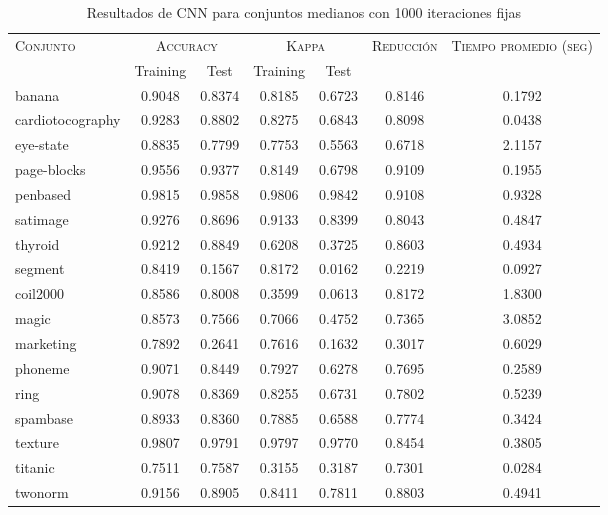 \begin{table}[]
\centering
\begin{tabular}{l c c c c c c}
\hline
\multirow{2}{*}{\textsc{Conjunto}}
	& \multicolumn{2}{c}{\textsc{Accuracy}}
	& \multicolumn{2}{c}{\textsc{Kappa}}
	& \textsc{Reducción}
	& \textsc{Tiempo promedio (seg)} \\
	& Training & Test
	& Training & Test \\ 
\hline
\hline

banana & 0.9048 & 0.8374 & 0.8185 & 0.6723 & 0.8146 & 0.1792 \\
cardiotocography & 0.9283 & 0.8802 & 0.8275 & 0.6843 & 0.8098 & 0.0438 \\
eye-state & 0.8835 & 0.7799 & 0.7753 & 0.5563 & 0.6718 & 2.1157 \\
page-blocks & 0.9556 & 0.9377 & 0.8149 & 0.6798 & 0.9109 & 0.1955 \\
penbased & 0.9815 & 0.9858 & 0.9806 & 0.9842 & 0.9108 & 0.9328 \\
satimage & 0.9276 & 0.8696 & 0.9133 & 0.8399 & 0.8043 & 0.4847 \\
thyroid & 0.9212 & 0.8849 & 0.6208 & 0.3725 & 0.8603 & 0.4934 \\
segment & 0.8419 & 0.1567 & 0.8172 & 0.0162 & 0.2219 & 0.0927 \\
coil2000 & 0.8586 & 0.8008 & 0.3599 & 0.0613 & 0.8172 & 1.8300 \\
magic & 0.8573 & 0.7566 & 0.7066 & 0.4752 & 0.7365 & 3.0852 \\
marketing & 0.7892 & 0.2641 & 0.7616 & 0.1632 & 0.3017 & 0.6029 \\
phoneme & 0.9071 & 0.8449 & 0.7927 & 0.6278 & 0.7695 & 0.2589 \\
ring & 0.9078 & 0.8369 & 0.8255 & 0.6731 & 0.7802 & 0.5239 \\
spambase & 0.8933 & 0.8360 & 0.7885 & 0.6588 & 0.7774 & 0.3424 \\
texture & 0.9807 & 0.9791 & 0.9797 & 0.9770 & 0.8454 & 0.3805 \\
titanic & 0.7511 & 0.7587 & 0.3155 & 0.3187 & 0.7301 & 0.0284 \\
twonorm & 0.9156 & 0.8905 & 0.8411 & 0.7811 & 0.8803 & 0.4941 \\

\hline
\end{tabular}
\caption{Resultados de CNN para conjuntos medianos con 1000 iteraciones fijas}
\label{res-med-cnn}
\end{table}

